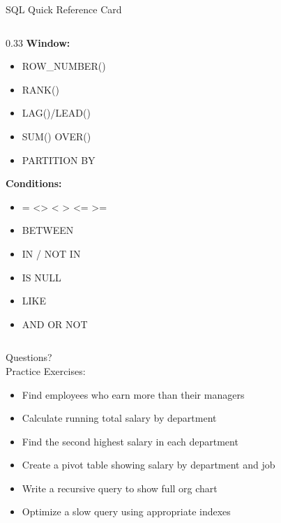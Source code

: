 \documentclass[aspectratio=169,11pt]{beamer}
\begin{document}
\begin{frame}{SQL Quick Reference Card}
\begin{columns}[T]
\pause
\begin{column}{0.33\textwidth}
\textbf{Window:}
\begin{itemize}
    \item ROW_NUMBER()
    \item RANK()
    \item LAG()/LEAD()
    \item SUM() OVER()
    \item PARTITION BY
\end{itemize}

\vspace{0.5cm}
\textbf{Conditions:}
\begin{itemize}
    \item = <> < > <= >=
    \item BETWEEN
    \item IN / NOT IN
    \item IS NULL
    \item LIKE
    \item AND OR NOT
\end{itemize}
\end{column}
\end{columns}
\end{frame}

\begin{frame}
\centering
\Huge Questions? \\[1cm]
\large Practice Exercises:
\normalsize
\begin{itemize}
    \item Find employees who earn more than their managers
    \item Calculate running total salary by department
    \item Find the second highest salary in each department
    \item Create a pivot table showing salary by department and job
    \item Write a recursive query to show full org chart
    \item Optimize a slow query using appropriate indexes
\end{itemize}
\end{frame}
\end{document}

